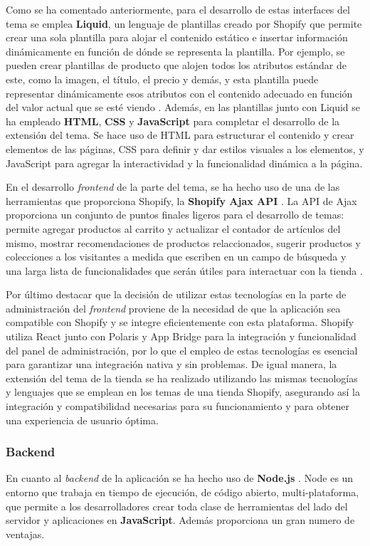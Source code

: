\documentclass[11pt]{article}
\begin{document}
Como se ha comentado anteriormente, para el desarrollo de estas interfaces del tema se emplea \textbf{Liquid}, un lenguaje de plantillas creado por Shopify que
permite crear una sola plantilla para alojar el contenido estático e insertar información dinámicamente en función de dónde se representa la plantilla.
Por ejemplo, se pueden crear plantillas de producto que alojen todos los atributos estándar de este, como la imagen, el título, el precio y demás, y esta 
plantilla puede representar dinámicamente esos atributos con el contenido adecuado en función del valor actual que se esté viendo \cite{shopify-dev}. 
Además, en las plantillas junto con Liquid se ha empleado \textbf{HTML}, \textbf{CSS} y \textbf{JavaScript} para completar el desarrollo de la extensión del tema. Se hace uso de HTML para estructurar
el contenido y crear elementos de las páginas, CSS para definir y dar estilos visuales a los elementos, y JavaScript para agregar la interactividad y la 
funcionalidad dinámica a la página. 

En el desarrollo \textit{frontend} de la parte del tema, se ha hecho uso de una de las herramientas que proporciona Shopify, la \textbf{Shopify Ajax API} \cite{shopify-ajax-api}. La API de Ajax
proporciona un conjunto de puntos finales ligeros para el desarrollo de temas: permite agregar productos al carrito y actualizar el contador
de artículos del mismo, mostrar recomendaciones de productos relaccionados, sugerir productos y colecciones a los visitantes a medida que escriben
en un campo de búsqueda y una larga lista de funcionalidades que serán útiles para interactuar con la tienda \cite{shopify-dev}.

Por último destacar que la decisión de utilizar estas tecnologías en la parte de administración del \textit{frontend} proviene de la necesidad de que la aplicación sea
compatible con Shopify y se integre eficientemente con esta plataforma. Shopify utiliza React junto con Polaris y App Bridge para la integración
y funcionalidad del panel de administración, por lo que el empleo de estas tecnologías es esencial para garantizar una integración nativa y sin problemas.
De igual manera, la extensión del tema de la tienda se ha realizado utilizando las mismas tecnologías y lenguajes que se emplean en los temas de una
tienda Shopify, asegurando así la integración y compatibilidad necesarias para su funcionamiento y para obtener una experiencia de usuario óptima.

\subsubsection{Backend}
En cuanto al \textit{backend} de la aplicación se ha hecho uso de \textbf{Node.js} \cite{node}. Node es un entorno que trabaja en tiempo de ejecución, de código abierto, multi-plataforma, 
que permite a los desarrolladores crear toda clase de herramientas del lado del servidor y aplicaciones en \textbf{JavaScript}. 
Además proporciona un gran numero de ventajas. 
\end{document}
